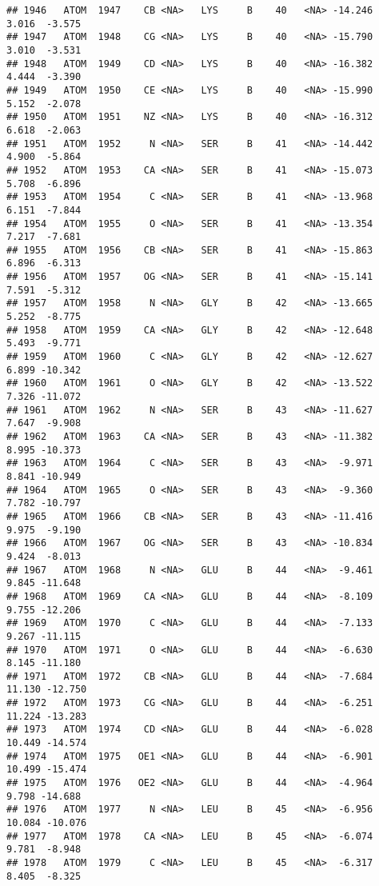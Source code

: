 \documentclass[
]{article}
\begin{document}
\begin{verbatim}
## 1946   ATOM  1947    CB <NA>   LYS     B    40   <NA> -14.246   3.016  -3.575
## 1947   ATOM  1948    CG <NA>   LYS     B    40   <NA> -15.790   3.010  -3.531
## 1948   ATOM  1949    CD <NA>   LYS     B    40   <NA> -16.382   4.444  -3.390
## 1949   ATOM  1950    CE <NA>   LYS     B    40   <NA> -15.990   5.152  -2.078
## 1950   ATOM  1951    NZ <NA>   LYS     B    40   <NA> -16.312   6.618  -2.063
## 1951   ATOM  1952     N <NA>   SER     B    41   <NA> -14.442   4.900  -5.864
## 1952   ATOM  1953    CA <NA>   SER     B    41   <NA> -15.073   5.708  -6.896
## 1953   ATOM  1954     C <NA>   SER     B    41   <NA> -13.968   6.151  -7.844
## 1954   ATOM  1955     O <NA>   SER     B    41   <NA> -13.354   7.217  -7.681
## 1955   ATOM  1956    CB <NA>   SER     B    41   <NA> -15.863   6.896  -6.313
## 1956   ATOM  1957    OG <NA>   SER     B    41   <NA> -15.141   7.591  -5.312
## 1957   ATOM  1958     N <NA>   GLY     B    42   <NA> -13.665   5.252  -8.775
## 1958   ATOM  1959    CA <NA>   GLY     B    42   <NA> -12.648   5.493  -9.771
## 1959   ATOM  1960     C <NA>   GLY     B    42   <NA> -12.627   6.899 -10.342
## 1960   ATOM  1961     O <NA>   GLY     B    42   <NA> -13.522   7.326 -11.072
## 1961   ATOM  1962     N <NA>   SER     B    43   <NA> -11.627   7.647  -9.908
## 1962   ATOM  1963    CA <NA>   SER     B    43   <NA> -11.382   8.995 -10.373
## 1963   ATOM  1964     C <NA>   SER     B    43   <NA>  -9.971   8.841 -10.949
## 1964   ATOM  1965     O <NA>   SER     B    43   <NA>  -9.360   7.782 -10.797
## 1965   ATOM  1966    CB <NA>   SER     B    43   <NA> -11.416   9.975  -9.190
## 1966   ATOM  1967    OG <NA>   SER     B    43   <NA> -10.834   9.424  -8.013
## 1967   ATOM  1968     N <NA>   GLU     B    44   <NA>  -9.461   9.845 -11.648
## 1968   ATOM  1969    CA <NA>   GLU     B    44   <NA>  -8.109   9.755 -12.206
## 1969   ATOM  1970     C <NA>   GLU     B    44   <NA>  -7.133   9.267 -11.115
## 1970   ATOM  1971     O <NA>   GLU     B    44   <NA>  -6.630   8.145 -11.180
## 1971   ATOM  1972    CB <NA>   GLU     B    44   <NA>  -7.684  11.130 -12.750
## 1972   ATOM  1973    CG <NA>   GLU     B    44   <NA>  -6.251  11.224 -13.283
## 1973   ATOM  1974    CD <NA>   GLU     B    44   <NA>  -6.028  10.449 -14.574
## 1974   ATOM  1975   OE1 <NA>   GLU     B    44   <NA>  -6.901  10.499 -15.474
## 1975   ATOM  1976   OE2 <NA>   GLU     B    44   <NA>  -4.964   9.798 -14.688
## 1976   ATOM  1977     N <NA>   LEU     B    45   <NA>  -6.956  10.084 -10.076
## 1977   ATOM  1978    CA <NA>   LEU     B    45   <NA>  -6.074   9.781  -8.948
## 1978   ATOM  1979     C <NA>   LEU     B    45   <NA>  -6.317   8.405  -8.325

\end{verbatim}
\end{document}
